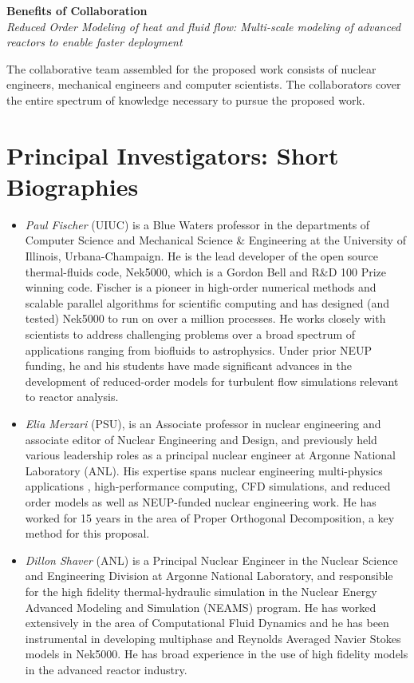 
\parindent 0in
\parskip 0.1in

\begin{center}
{\bf Benefits of Collaboration } \\
{\it  Reduced Order Modeling of heat and fluid flow: Multi-scale modeling of advanced reactors to enable faster deployment }
\end{center}

The collaborative team assembled for the proposed work consists of nuclear
engineers, mechanical engineers and computer scientists.  The collaborators
cover the entire spectrum of knowledge necessary to pursue the proposed work.

\section{Principal Investigators: Short Biographies}
\begin{itemize}
\item \textit{Paul Fischer} (UIUC) is a Blue Waters professor in the
departments of Computer Science and Mechanical Science \& Engineering
at the University of Illinois, Urbana-Champaign.  He is the lead developer
of the open source thermal-fluids code, Nek5000, which is a Gordon Bell
and R\&D 100 Prize winning code.  Fischer is a pioneer in high-order
numerical methods and scalable parallel algorithms for scientific computing
and has designed (and tested) Nek5000 to run on over a million processes.
He works closely with scientists to address challenging problems over a broad
spectrum of applications ranging from biofluids to astrophysics.
Under prior NEUP funding, he and his students have made significant advances
in the development of reduced-order models for turbulent flow simulations
relevant to reactor analysis.



\item \textit{Elia Merzari} (PSU), is an Associate professor in nuclear
engineering and associate editor of Nuclear Engineering and Design, and
previously held various leadership roles as a principal nuclear engineer at
Argonne National Laboratory (ANL). His expertise spans nuclear engineering
multi-physics applications , high-performance computing, CFD simulations, and
reduced order models as well as NEUP-funded nuclear engineering work.  He has
worked for 15 years in the area of Proper Orthogonal Decomposition, a key
method for this proposal.

\item \textit{Dillon Shaver} (ANL) is a Principal Nuclear Engineer in the
Nuclear Science and Engineering Division at Argonne National Laboratory, and
responsible for the high fidelity thermal-hydraulic simulation in the Nuclear
Energy Advanced Modeling and Simulation (NEAMS) program. He has worked
extensively in the area of Computational Fluid Dynamics and he has been
instrumental in developing multiphase and Reynolds Averaged Navier Stokes
models in Nek5000. He has broad experience in the use of high fidelity models
in the advanced reactor industry.

\end{itemize}
